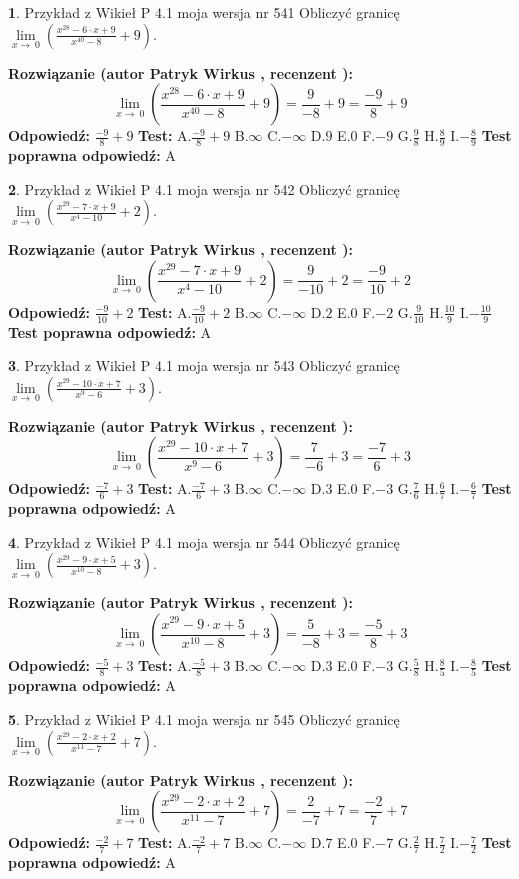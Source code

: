\documentclass[12pt, a4paper]{article}
\theoremstyle{definition} %
\newtheorem{zad}{}
\newcommand{\zadStart}[1]{\begin{zad}#1\newline}
\newcommand{\zadStop}{\end{zad}}
\newcommand{\rozwStart}[2]{\noindent \textbf{Rozwiązanie (autor #1 , recenzent #2): }\newline}
\newcommand{\rozwStop}{\newline}
\newcommand{\odpStart}{\noindent \textbf{Odpowiedź:}\newline}
\newcommand{\odpStop}{\newline}
\newcommand{\testStart}{\noindent \textbf{Test:}\newline}
\newcommand{\testStop}{\newline}
\newcommand{\kluczStart}{\noindent \textbf{Test poprawna odpowiedź:}\newline}
\newcommand{\kluczStop}{\newline}
\begin{document}
\zadStart{Przykład z Wikieł P 4.1 moja wersja nr 541}
Obliczyć granicę $\lim\limits_{x\to\ 0}(\frac{x^{28}-6 \cdot x +9}{x^{40}-8}+9)$.
\zadStop
\rozwStart{Patryk Wirkus}{}
$$\lim\limits_{x\to\ 0}(\frac{x^{28}-6 \cdot x +9}{x^{40}-8}+9)=\frac{9}{-8}+9=\frac{-9}{8}+9$$
\rozwStop
\odpStart
$\frac{-9}{8}+9$
\odpStop
\testStart
A.$\frac{-9}{8}+9$
B.$\infty$
C.$-\infty$
D.$9$
E.$0$
F.$-9$
G.$\frac{9}{8}$
H.$\frac{8}{9}$
I.$-\frac{8}{9}$
\testStop
\kluczStart
A
\kluczStop



\zadStart{Przykład z Wikieł P 4.1 moja wersja nr 542}
Obliczyć granicę $\lim\limits_{x\to\ 0}(\frac{x^{29}-7 \cdot x +9}{x^{4}-10}+2)$.
\zadStop
\rozwStart{Patryk Wirkus}{}
$$\lim\limits_{x\to\ 0}(\frac{x^{29}-7 \cdot x +9}{x^{4}-10}+2)=\frac{9}{-10}+2=\frac{-9}{10}+2$$
\rozwStop
\odpStart
$\frac{-9}{10}+2$
\odpStop
\testStart
A.$\frac{-9}{10}+2$
B.$\infty$
C.$-\infty$
D.$2$
E.$0$
F.$-2$
G.$\frac{9}{10}$
H.$\frac{10}{9}$
I.$-\frac{10}{9}$
\testStop
\kluczStart
A
\kluczStop



\zadStart{Przykład z Wikieł P 4.1 moja wersja nr 543}
Obliczyć granicę $\lim\limits_{x\to\ 0}(\frac{x^{29}-10 \cdot x +7}{x^{9}-6}+3)$.
\zadStop
\rozwStart{Patryk Wirkus}{}
$$\lim\limits_{x\to\ 0}(\frac{x^{29}-10 \cdot x +7}{x^{9}-6}+3)=\frac{7}{-6}+3=\frac{-7}{6}+3$$
\rozwStop
\odpStart
$\frac{-7}{6}+3$
\odpStop
\testStart
A.$\frac{-7}{6}+3$
B.$\infty$
C.$-\infty$
D.$3$
E.$0$
F.$-3$
G.$\frac{7}{6}$
H.$\frac{6}{7}$
I.$-\frac{6}{7}$
\testStop
\kluczStart
A
\kluczStop



\zadStart{Przykład z Wikieł P 4.1 moja wersja nr 544}
Obliczyć granicę $\lim\limits_{x\to\ 0}(\frac{x^{29}-9 \cdot x +5}{x^{10}-8}+3)$.
\zadStop
\rozwStart{Patryk Wirkus}{}
$$\lim\limits_{x\to\ 0}(\frac{x^{29}-9 \cdot x +5}{x^{10}-8}+3)=\frac{5}{-8}+3=\frac{-5}{8}+3$$
\rozwStop
\odpStart
$\frac{-5}{8}+3$
\odpStop
\testStart
A.$\frac{-5}{8}+3$
B.$\infty$
C.$-\infty$
D.$3$
E.$0$
F.$-3$
G.$\frac{5}{8}$
H.$\frac{8}{5}$
I.$-\frac{8}{5}$
\testStop
\kluczStart
A
\kluczStop



\zadStart{Przykład z Wikieł P 4.1 moja wersja nr 545}
Obliczyć granicę $\lim\limits_{x\to\ 0}(\frac{x^{29}-2 \cdot x +2}{x^{11}-7}+7)$.
\zadStop
\rozwStart{Patryk Wirkus}{}
$$\lim\limits_{x\to\ 0}(\frac{x^{29}-2 \cdot x +2}{x^{11}-7}+7)=\frac{2}{-7}+7=\frac{-2}{7}+7$$
\rozwStop
\odpStart
$\frac{-2}{7}+7$
\odpStop
\testStart
A.$\frac{-2}{7}+7$
B.$\infty$
C.$-\infty$
D.$7$
E.$0$
F.$-7$
G.$\frac{2}{7}$
H.$\frac{7}{2}$
I.$-\frac{7}{2}$
\testStop
\kluczStart
A
\kluczStop
\end{document}
